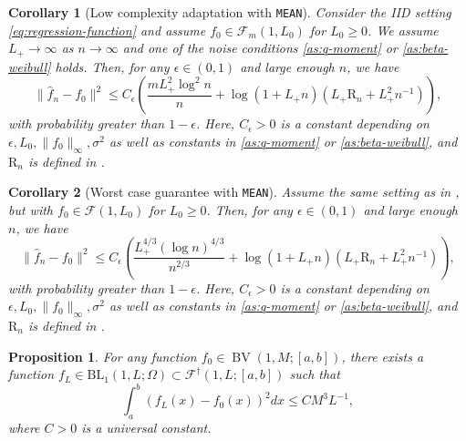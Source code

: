 \documentclass[10pt,a4paper]{amsart}
\newtheorem{corollary}{Corollary}
\newtheorem{proposition}{Proposition}
\begin{document}
 \begin{corollary}[Low complexity adaptation with \texttt{MEAN}]\label{cor:low-complexity} Consider the IID setting \eqref{eq:regression-function} and assume $f_0 \in \mathcal{F}_m(1, L_0)$ for $L_0 \ge 0$. We assume $L_+\rightarrow \infty$ as $n \rightarrow\infty$ and one of the noise conditions \ref{as:q-moment} or \ref{as:beta-weibull} holds. Then, for any $\epsilon \in(0,1)$ and large enough $n$, we have
\begin{equation*}
\|\widehat{f}_n-f_0\|^2 \leq C_\epsilon\left(\frac{m L_{+}^2 \log ^2 n}{n}+\log \left(1+L_{+} n\right)\left(L_{+} \mathrm{R}_n+L_{+}^2 n^{-1}\right)\right),
\end{equation*}
with probability greater than $1-\epsilon$. Here, $C_\epsilon > 0$ is a constant depending on $\epsilon, L_0, \|f_0\|_\infty, \sigma^2$ as well as constants in \ref{as:q-moment} or \ref{as:beta-weibull}, and $\mathrm{R}_n$ is defined in .
\end{corollary}

\begin{corollary}[Worst case guarantee with \texttt{MEAN}]\label{cor:worst-case} 
Assume the same setting as in , but with $f_0\in\mathcal{F}(1,L_0)$ for $L_0 \ge 0$.
Then, for any $\epsilon\in(0,1)$ and large enough $n$, we have
\begin{equation*}
\|\widehat{f}_n-f_0\|^2 \leq C_\epsilon\left(\frac{L_{+}^{4 / 3}(\log n)^{4 / 3}}{n^{2 / 3}}+\log \left(1+L_{+} n\right)\left(L_{+} \mathrm{R}_n+L_{+}^2 n^{-1}\right)\right),
\end{equation*}
with probability greater than $1-\epsilon$. Here, $C_\epsilon >0$ is a constant depending on $\epsilon, L_0, \|f_0\|_\infty, \sigma^2$ as well as constants in \ref{as:q-moment} or \ref{as:beta-weibull}, and $\mathrm{R}_n$ is defined in .
\end{corollary}

\begin{proposition}\label{prop: BV approximation}
For any function $f_0 \in \operatorname{BV}(1, M;[a,b])$, there exists a function $f_{L}\in\mathrm{BL}_1(1, L ; \Omega)\subset\mathcal{F}^\dagger(1,L;[a,b])$ such that 
\begin{equation*}
\int_a^b\left(f_L(x)-f_0(x)\right)^2 d x \leq CM^3 L^{-1},
\end{equation*}
where $C>0$ is a universal constant.
\end{proposition}
\end{document}
